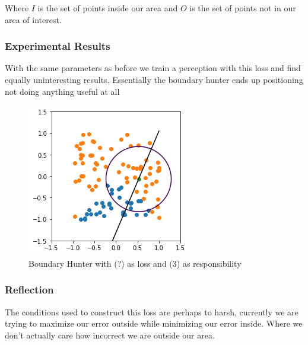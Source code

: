 \documentclass{article}
\begin{document}
Where $I$ is the set of points inside our area and $O$ is the set of points not in our area of interest.

\subsubsection{Experimental Results}

With the same parameters as before we train a perception with this loss and find equally uninteresting results. Essentially the boundary hunter ends up positioning not doing anything useful at all

\begin{figure}[H]
\centering
  \begin{minipage}[b]{0.4\textwidth}
    \includegraphics[width=\textwidth]{BoundaryHunter-Attempt2-01.png}
    \caption{Boundary Hunter with (?) as loss and (3) as responsibility}
  \end{minipage}
  \hfill
\end{figure}

\subsubsection{Reflection}
The conditions used to construct this loss are perhaps to harsh, currently we are trying to maximize our error outside while minimizing our error inside. Where we don't actually care how incorrect we are outside our area.
\end{document}
